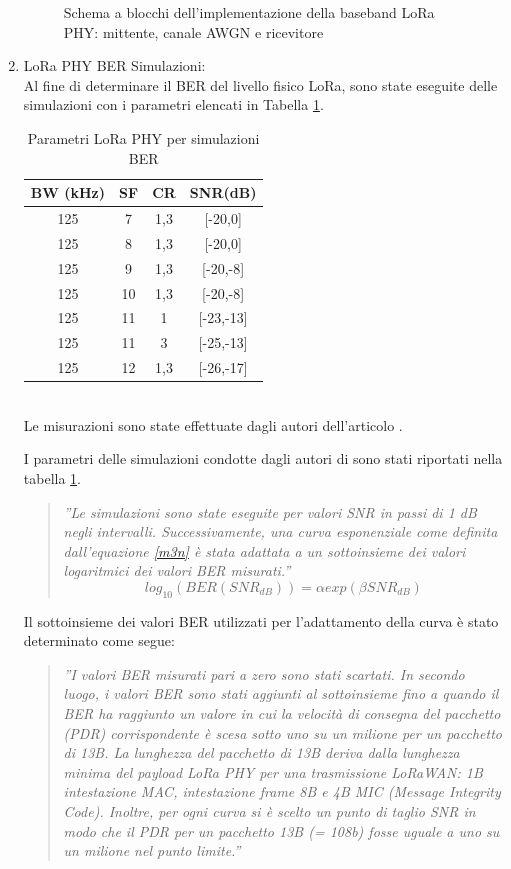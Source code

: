 \documentclass[a4paper]{report} %
\begin{document}
\begin{enumerate}
\begin{figure}
\caption{Schema a blocchi dell'implementazione della baseband LoRa PHY: mittente, canale AWGN e ricevitore}
\label{fig:schemaloraphy}
\end{figure}
\item LoRa PHY BER Simulazioni:  \\
Al fine di determinare il BER del livello fisico LoRa, sono state eseguite delle simulazioni con i parametri elencati in Tabella \ref{tab:loraphy}. 


\begin{table}
\caption{Parametri LoRa PHY per simulazioni BER} 
\label{tab:loraphy}
\begin{center}
\begin{tabular}{|c|c|c|c|}
BW (kHz)&SF&CR&SNR(dB)\\ \hline
125&7&1,3&[-20,0]\\ \hline
125&8&1,3&[-20,0]\\ \hline
125&9&1,3&[-20,-8]\\ \hline
125&10&1,3&[-20,-8]\\ \hline
125&11&1&[-23,-13]\\ \hline
125&11&3&[-25,-13]\\ \hline
125&12&1,3&[-26,-17]\\ \hline
\end{tabular} 
\\
Le misurazioni sono state effettuate dagli autori dell'articolo \cite{art:rif.49}. \\
\end{center}
\end{table}


I parametri delle simulazioni condotte dagli autori di \cite{art:rif.49} sono stati riportati nella tabella \ref{tab:loraphy}.
\begin{quote}
	\textit{''Le simulazioni sono state eseguite per valori SNR in passi di 1 dB negli intervalli. Successivamente, una curva esponenziale come definita dall'equazione \ref{m3n} è stata adattata a un sottoinsieme dei valori logaritmici dei valori BER misurati.''}
	\begin{equation}
	log_{10}(BER (SNR_{dB})) = \alpha exp (\beta SNR_{dB})
	\end{equation}
\end{quote}
Il sottoinsieme dei valori BER utilizzati per l'adattamento della curva è stato determinato come segue:
\begin{quote}
	\textit{''I valori BER misurati pari a zero sono stati scartati. In secondo luogo, i valori BER sono stati aggiunti al sottoinsieme fino a quando il BER ha raggiunto un valore in cui la velocità di consegna del pacchetto (PDR) corrispondente è scesa sotto uno su un milione per un pacchetto di 13B. La lunghezza del pacchetto di 13B deriva dalla lunghezza minima del payload LoRa PHY per una trasmissione LoRaWAN: 1B intestazione MAC, intestazione frame 8B e 4B MIC (Message Integrity Code). Inoltre, per ogni curva si è scelto un punto di taglio SNR in modo che il PDR per un pacchetto 13B (= 108b) fosse uguale a uno su un milione nel punto limite.''}
\end{quote}
\end{enumerate}
\end{document}
